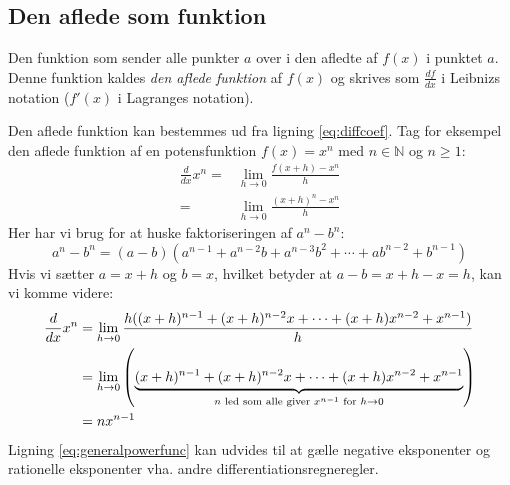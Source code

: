 \documentclass[a4paper, 11pt]{article}
\begin{document}
\subsection{Den aflede som funktion}
Den funktion som sender alle punkter $a$ over i den afledte af $f(x)$ i punktet $a$. Denne funktion kaldes \emph{den aflede funktion} af $f(x)$ og skrives som $\frac{df}{dx}$ i Leibnizs notation ($f'(x)$ i Lagranges notation).

Den aflede funktion kan bestemmes ud fra ligning \eqref{eq:diffcoef}. Tag for eksempel den aflede funktion af en potensfunktion $f(x) = x^n$ med $n \in \mathbb{N}$ og $n \geq 1$:
\begin{align}
\frac{d}{dx}x^n =& \lim_{h\to0}\frac{f(x+h) - x^n}{h} \\
                =& \lim_{h\to0}\frac{(x+h)^n - x^n}{h}\label{eq:powerstuck}
\end{align}
Her har vi brug for at huske faktoriseringen af $a^n - b^n$:
\begin{equation}
a^n - b^n = (a-b)(a^{n-1} + a^{n-2}b + a^{n-3}b^2 + \cdots + a b^{n-2} + b^{n-1})
\end{equation} 
Hvis vi sætter $a=x+h$ og $b=x$, hvilket betyder at $a-b=x+h-x=h$, kan vi komme videre:
\begin{align}
\frac{d}{dx}x^n &= \lim_{h\to0}\frac{h((x+h)^{n-1} + (x+h)^{n-2}x + \cdots + (x+h)x^{n-2} + x^{n-1})}{h}\notag \\
                &= \lim_{h\to0}\left(\underbrace{(x+h)^{n-1} + (x+h)^{n-2}x + \cdots + (x+h)x^{n-2} + x^{n-1}}_
                   {n\text{ led som alle giver } x^{n-1}\text{ for } h\to0}\right)\notag \\
                &= nx^{n-1}\label{eq:generalpowerfunc}
\end{align}
Ligning \eqref{eq:generalpowerfunc} kan udvides til at gælle negative eksponenter og rationelle eksponenter vha. andre differentiationsregneregler.
\end{document}
